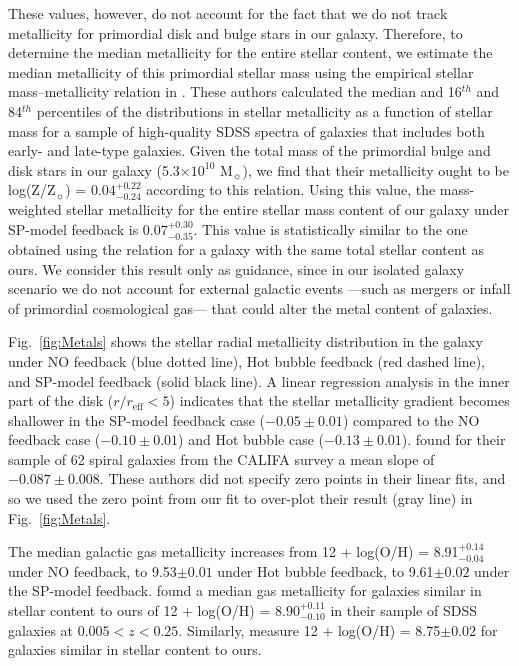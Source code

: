 \documentclass[iop]{emulateapj}
\begin{document}
These values, however, do not account for the fact that we do not track metallicity for primordial disk and bulge stars in our galaxy. Therefore, to determine the median metallicity for the entire stellar content, we estimate the median metallicity of this primordial stellar mass using the empirical stellar mass--metallicity relation in \citet{Gallazzi2005}. These authors calculated the median and 16$^{th}$ and 84$^{th}$ percentiles of the distributions in stellar metallicity as a function of stellar mass for a sample of high-quality SDSS spectra of galaxies that includes both early- and late-type galaxies. Given the total mass of the primordial bulge and disk stars in our galaxy (5.3$\times 10^{10}$ M$_{\sun}$), we find that their metallicity ought to be log(Z/Z$_{\sun}$) = $0.04^{+0.22}_{-0.24}$ according to this relation. Using this value, the mass-weighted stellar metallicity for the entire stellar mass content of our galaxy under SP-model feedback is $0.07^{+0.30}_{-0.35}$. This value is statistically similar to the one obtained using the \citet{Gallazzi2005} relation for a galaxy with the same total stellar content as ours. We consider this result only as guidance, since in our isolated galaxy scenario we do not account for external galactic events ---such as mergers or infall of primordial cosmological gas--- that could alter the metal content of galaxies.

Fig.~\ref{fig:Metals} shows the stellar radial metallicity distribution in the galaxy under NO feedback (blue dotted line), Hot bubble feedback (red dashed line), and SP-model feedback (solid black line). A linear regression analysis in the inner part of the disk ($r/r_{\mathrm{eff}}<5$) indicates that the stellar metallicity gradient becomes shallower in the SP-model feedback case ($-0.05\pm0.01$) compared to the NO feedback case ($-0.10\pm0.01$) and Hot bubble case ($-0.13\pm0.01$). \citet{Sanchez-Blazquez2014} found for their sample of 62 spiral galaxies from the CALIFA survey a mean slope of $-0.087\pm0.008$. These authors did not specify zero points in their linear fits, and so we used the zero point from our fit to over-plot their result (gray line) in Fig.~\ref{fig:Metals}.

The median galactic gas metallicity increases from 12 + log(O/H) = 8.91$^{+0.14}_{-0.04}$ under NO feedback, to 9.53$\pm0.01$ under Hot bubble feedback, to 9.61$\pm0.02$ under the SP-model feedback. \citet{Tremonti2004} found a median gas metallicity for galaxies similar in stellar content to ours of 12 + log(O/H) = $8.90^{+0.11}_{-0.10}$ in their sample of SDSS galaxies at $0.005 < z < 0.25$. Similarly, \citet{Andrews2013} measure 12 + log(O/H) = 8.75$\pm0.02$ for galaxies similar in stellar content to ours.
\end{document}
